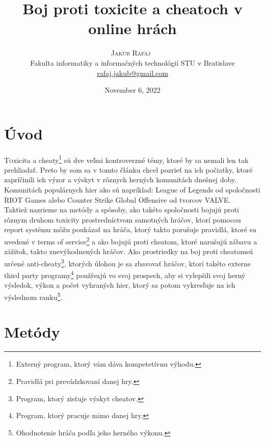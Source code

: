 \documentclass[twoside,twocolumn]{article}
\title{Boj proti toxicite a cheatoch v online hrách} %
\author{%
\textsc{Jakub Rafaj}\
\\[1ex]
\normalsize Fakulta informatiky a informačných technológií STU v Bratislave  \\%
\normalsize \href{mailto:rafaj.jakub@gmail.com}{rafaj.jakub@gmail.com} %
}
\date{November 6, 2022} %
\begin{document}
\maketitle

\tableofcontents
\section{Úvod}

\lettrine[nindent=0em,lines=3]{T}oxicita a cheaty\footnote[1]{Externý program, ktorý vám dáva kompetetívnu výhodu.} sú dve veľmi kontroverzné témy, ktoré by sa nemali len tak prehliadať. Preto by som sa v tomto článku chcel pozrieť na ich počiatky, ktoré zapríčinili ich výzor a výskyt v rôznych herných komunitách dnešnej doby. Komunitách populárnych hier ako sú napríklad: League of Legends od spoločnosti RIOT Games alebo Counter Strike Global Offensive od tvorcov VALVE.\\
Taktiež nazrieme na metódy a spôsoby, ako takéto spoločnosti bojujú proti rôznym druhom toxicity prostredníctvom samotných hráčov, ktorí pomocou report systému môžu poukázať na hráča, ktorý takto porušuje pravidlá, ktoré su uvedené v terms of service\footnote[2]{Pravidlá pri prevádzkovaní danej hry.} a ako bojujú proti cheatom\footnotemark[1], ktoré narušujú zábavu a zážitok, takto znevýhodnených hráčov. Ako prostriedky na boj proti cheatom\footnotemark[1] sú určené anti-cheaty\footnote[3]{Program, ktorý zisťuje výskyt cheatov.}, ktorých úlohou je sa zbavovať hráčov, ktorí takéto externe third party programy\footnote[4]{Program, ktorý pracuje mimo danej hry.} používajú vo svoj prospech, aby si vylepšili svoj herný výsledok, výkon a počet vyhraných hier, ktorý sa potom vykresľuje na ich výslednom ranku\footnote[5]{Ohodnotenie hráča podľa jeho herného výkonu.}.
\newpage


\section{Metódy}
\end{document}
